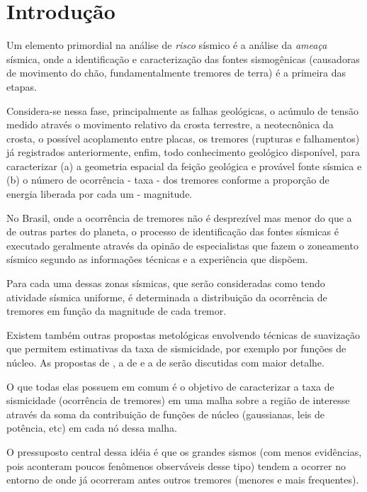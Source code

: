 \chapter{Introdução}
\label{cap:introducao}

Um elemento primordial na análise
de \emph{risco} sísmico é a análise da \emph{ameaça} sísmica,
onde a identificação e caracterização das fontes sismogênicas (causadoras de
movimento do chão, fundamentalmente tremores de terra) é a primeira das etapas. 

Considera-se nessa fase, principalmente as falhas
geológicas, o acúmulo de tensão medido através o movimento relativo da crosta
terrestre, a neotecnônica da crosta, o possível acoplamento entre placas, os tremores
(rupturas e falhamentos) já registrados anteriormente, enfim, todo conhecimento geológico
disponível, para caracterizar (a) a geometria espacial da feição geológica e provável fonte
sísmica e (b) o número de ocorrência - taxa - dos tremores conforme a
proporção de energia liberada por cada um - magnitude.

No Brasil, onde a ocorrência de tremores não é desprezível mas menor do que a de
outras partes do planeta, o processo de identificação das fontes sísmicas é
executado geralmente através da opinão de especialistas que fazem o zoneamento
sísmico segundo as informações técnicas e a experiência que dispõem.

Para cada uma dessas zonas sísmicas, que serão consideradas como tendo atividade
sísmica uniforme, é determinada a distribuição da ocorrência de tremores em função
da magnitude de cada tremor.

Existem também outras propostas metológicas envolvendo técnicas de suavização
que permitem estimativas da taxa de sismicidade, por exemplo por funções de núcleo.
As propostas de \citet{frankel_1995}, a de \citet{woo_1996} e a de
\citet{helmstetter_2012} serão discutidas com maior detalhe.

O que todas elas possuem em comum é o objetivo de caracterizar a taxa de
sismicidade (ocorrência de tremores) em uma malha sobre a região de interesse
através da soma da contribuição de funções de núcleo (gaussianas, leis de
potência, etc) em cada nó dessa malha.

O pressuposto central dessa
idéia é que os grandes sismos (com menos evidências, pois
aconteram poucos fenômenos observáveis desse tipo) 
tendem a ocorrer no entorno de
onde já ocorreram antes outros tremores (menores e mais frequentes).

